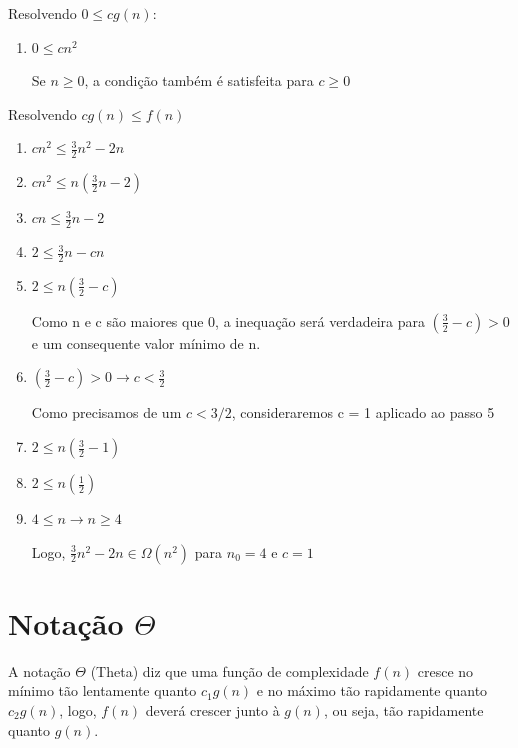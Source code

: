 \documentclass[ a4paper, twocolumn]{article}
\theoremstyle{definition}
\begin{document}
Resolvendo $0 \leq cg(n)$:


\begin{enumerate}[Step 1:]
	\item $0 \leq cn^2$
	
	Se $n \geq 0$, a condição também é satisfeita para $c \geq 0$
	
\end{enumerate}

Resolvendo $cg(n) \leq f(n)$

\begin{enumerate}[Step 1:]	
	\item $cn^2 \leq \frac{3}{2}n^2 - 2n$
		
	\item $cn^2 \leq n(\frac{3}{2}n - 2)$	
	
	\item $cn \leq \frac{3}{2}n - 2$
	
	\item $2 \leq \frac{3}{2}n - cn$
	
	\item $2 \leq n(\frac{3}{2} - c)$
	
	Como n e c são maiores que 0, a inequação será verdadeira para $(\frac{3}{2} - c) > 0$ e um consequente valor mínimo de n.
	
	\item $(\frac{3}{2} - c) > 0 \rightarrow c < \frac{3}{2}$
	
	Como precisamos de um $c < 3/2$, consideraremos c = 1 aplicado ao passo 5
	
	\item $2 \leq n(\frac{3}{2} - 1)$
	
	\item $2 \leq n(\frac{1}{2})$

	\item $4 \leq n \rightarrow n \geq 4$
	
	Logo, $\frac{3}{2}n^2 - 2n \in \Omega(n^2)$ para $n_0 = 4$ e $c = 1$
		
\end{enumerate}

\section{Notação $\Theta$}
A notação $\Theta$ (Theta) diz que uma função de complexidade $f(n)$ cresce no mínimo tão lentamente quanto $c_1g(n)$ e no máximo tão rapidamente quanto $c_2g(n)$, logo, $f(n)$ deverá crescer junto à $g(n)$, ou seja, tão rapidamente quanto $g(n)$.
\end{document}

